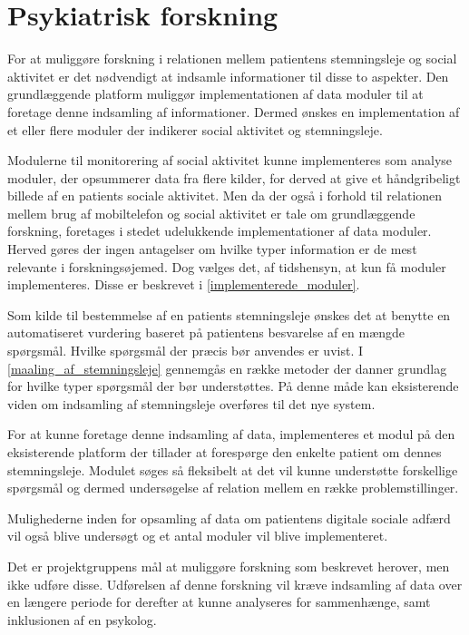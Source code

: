 \chapter{Psykiatrisk forskning}\label{problem}
For at muliggøre forskning i relationen mellem patientens stemningsleje og social aktivitet er det nødvendigt at indsamle informationer til disse to aspekter.
Den grundlæggende platform muliggør implementationen af data moduler  til at foretage denne indsamling af informationer.
Dermed ønskes en implementation af et eller flere moduler der indikerer social aktivitet og stemningsleje.

Modulerne til monitorering af social aktivitet kunne implementeres som analyse moduler, der opsummerer data fra flere kilder, for derved at give et håndgribeligt billede af en patients sociale aktivitet.
Men da der også i forhold til relationen mellem brug af mobiltelefon og social aktivitet er tale om grundlæggende forskning, foretages i stedet udelukkende implementationer af data moduler.
Herved gøres der ingen antagelser om hvilke typer information er de mest relevante i forskningsøjemed.
Dog vælges det, af tidshensyn, at kun få moduler implementeres.
Disse er beskrevet i \cref{implementerede_moduler}.

Som kilde til bestemmelse af en patients stemningsleje ønskes det at benytte en automatiseret vurdering baseret på patientens besvarelse af en mængde spørgsmål.
Hvilke spørgsmål der præcis bør anvendes er uvist.
I \cref{maaling_af_stemningsleje} gennemgås en række metoder der danner grundlag for hvilke typer spørgsmål der bør understøttes.
På denne måde kan eksisterende viden om indsamling af stemningsleje overføres til det nye system.


For at kunne foretage denne indsamling af data, implementeres et modul på den eksisterende platform \citefaelles{} der tillader at forespørge den enkelte patient om dennes stemningsleje.
Modulet søges så fleksibelt at det vil kunne understøtte forskellige spørgsmål og dermed undersøgelse af relation mellem en række problemstillinger.

Mulighederne inden for opsamling af data om patientens digitale sociale adfærd vil også blive undersøgt og et antal moduler vil blive implementeret.

Det er projektgruppens mål at muliggøre forskning som beskrevet herover, men ikke udføre disse.
Udførelsen af denne forskning vil kræve indsamling af data over en længere periode for derefter at kunne analyseres for sammenhænge, samt inklusionen af en psykolog.